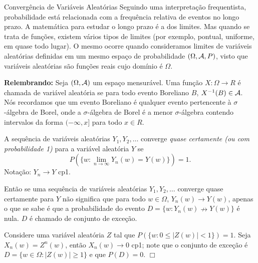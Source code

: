 \begin{frame}{Convergência de Variáveis Aleatórias}
%
Seguindo uma interpretação frequentista, probabilidade está
relacionada com a frequência relativa de eventos no longo prazo. A
matemática para estudar o longo prazo é a dos limites. Mas quando se
trata de funções, existem vários tipos de limites (por exemplo,
pontual, uniforme, em quase todo lugar). O mesmo ocorre quando
consideramos limites de variáveis aleatórias definidas em um mesmo
espaço de probabilidade $(\Omega,{\cal A},P)$, visto que variáveis
aleatórias são funções reais cujo domínio é $\Omega$.

{\bf Relembrando:} Seja $(\Omega,{\cal A})$ um espaço mensurável. Uma
função $X:\Omega \rightarrow R$ é chamada de variável aleatória se
para todo evento Boreliano $B$, $X^{-1}(B)\in {\cal A}$. Nós recordamos
que um evento Boreliano é qualquer evento pertencente à
$\sigma$-álgebra de Borel, onde a $\sigma$-álgebra de Borel é a
menor $\sigma$-álgebra contendo intervalos da forma $(-\infty,x]$
para todo $x\in R$.
%
\end{frame}
%
\begin{frame}
%
\begin{defi}
A sequência de variáveis aleatórias $Y_1,Y_2,\ldots$ converge {\em
quase certamente (ou com probabilidade 1)} para a variável aleatória
$Y$ se
%
$$P(\{w:\lim_{n\rightarrow\infty}Y_n(w)=Y(w)\})=1.$$
Notação: $Y_n\rightarrow Y$ cp1.
\end{defi}
%
%
%
%
Então se uma sequência de variáveis aleatórias $Y_1,Y_2,\ldots$
converge quase certamente para $Y$ não significa que para todo $w\in
\Omega$, $Y_n(w)\rightarrow Y(w)$, apenas o que se sabe é que a
probabilidade do evento $D=\{w:Y_n(w)\nrightarrow Y(w)\}$ é nula.
$D$ é chamado de conjunto de exceção.
%
%
%
%
%
\begin{exem}
Considere uma variável aleatória $Z$ tal que $P(\{w:0\leq
|Z(w)|<1\})=1$. Seja $X_n(w)=Z^n(w)$, então $X_n(w)\rightarrow 0$
cp1; note que o conjunto de exceção é $D=\{w\in\Omega:|Z(w)|\geq
1\}$ e que $P(D)=0$. $\Box$
\end{exem}
%
\end{frame}
